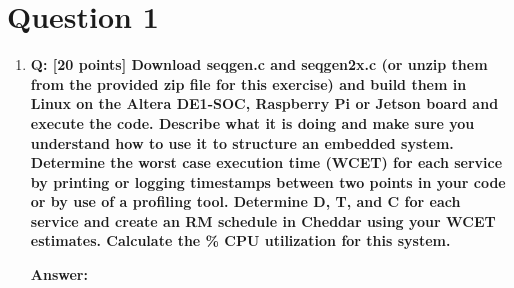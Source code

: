 \documentclass[a4paper,11pt]{article}%
\newenvironment{qanda}{\setlength{\parindent}{0pt}}{\bigskip}
\newcommand{\Q}{\bigskip\bfseries Q: }
\newcommand{\A}{\par\textbf{Answer: } \normalfont}
\begin{document}
\pagebreak
\begin{qanda}
	\section{Question 1}
	\begin{enumerate}
		\item[] \Q [20 points] Download seqgen.c and seqgen2x.c (or unzip them from the provided zip file for
			this exercise) and build them in Linux on the Altera DE1-SOC, Raspberry Pi or Jetson board
			and execute the code. Describe what it is doing and make sure you understand how to use it
			to structure an embedded system. Determine the worst case execution time (WCET) for each
			service by printing or logging timestamps between two points in your code or by use of a
			profiling tool. Determine D, T, and C for each service and create an RM schedule in
			Cheddar using your WCET estimates. Calculate the \% CPU utilization for this system.
			\A


\end{enumerate}
\end{qanda}
\end{document}
